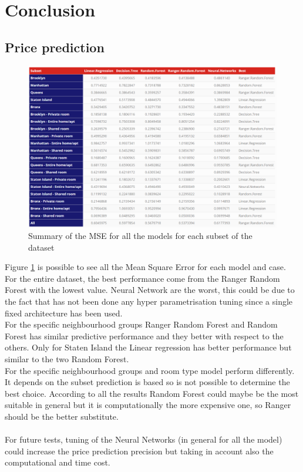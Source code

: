 \documentclass{FR16}
\begin{document}
\newpage



\section{Conclusion}
 
 
\subsection{Price prediction}
\begin{figure}[H]
\centering
\includegraphics[width=1\textwidth]{figures/model_summary.PNG} 
\caption{\label{fig:37} Summary of the MSE for all the models for each subset of the dataset }
\end{figure}
\newpage
\noindent Figure \ref{fig:37} is possible to see all the Mean Square Error for each model and case. \\
For the entire dataset, the best performance come from the Ranger Random Forest with the lowest value. Neural Network are the worst, this could be due to the fact that has not been done any  hyper parametrisation tuning since a single fixed architecture has been used. 
\\
For the specific neighbourhood groups Ranger Random Forest and Random Forest has similar predictive performance and they better with respect to the others. Only for Staten Island the Linear regression has better performance but similar to the two Random Forest.
\\ 
For the specific neighbourhood groups and room type model perform differently. It depends on the subset prediction is based so is not possible to determine the best choice. According to all the results Random Forest could maybe be the most suitable in general but it is computationally the more expensive one, so Ranger should be the better substitute. 
\\\\
For future tests, tuning of the Neural Networks (in general for all the model) could increase the price prediction precision but taking in account also the computational and time cost.
\\\\
\end{document}
